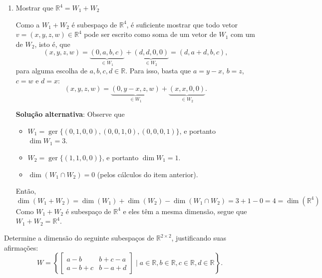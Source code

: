 \documentclass[12pt,a4paper]{article}
\newcommand*\R{\mathbb{R}}
\begin{document}
\begin{ExerciseList}
\begin{enumerate}
\item Mostrar que $\R^4 = W_1 + W_2$

Como a $W_1 + W_2$ é subespaço de $\R^4$, é suficiente mostrar que todo vetor $v = (x,y,z,w) \in \R^4$ pode ser escrito como soma de um vetor de $W_1$ com um de $W_2$, isto é, que
\[
(x,y,z,w) = \underbrace{(0,a,b,c)}_{\in W_1} + \underbrace{(d,d,0,0)}_{\in W_2} = (d,a+d,b,c),
\]
para alguma escolha de $a,b,c,d \in \R$. Para isso, basta que $a = y-x$, $b = z$, $c=w$ e $d=x$:
\[
(x,y,z,w) = \underbrace{(0,y-x,z,w)}_{\in W_1} + \underbrace{(x,x,0,0)}_{\in W_2}.
\]

\textbf{Solução alternativa}: Observe que
\begin{itemize}
\item $W_1 = \operatorname{ger}\{ (0,1,0,0), (0,0,1,0), (0,0,0,1) \}$, e portanto $\dim{W_1} = 3$.
\item $W_2 = \operatorname{ger}\{ (1,1,0,0) \}$, e portanto $\dim{W_1} = 1$.
\item $\dim{(W_1 \cap W_2)} = 0$ (pelos cálculos do item anterior).
\end{itemize}
Então,
\[
\dim{(W_1 + W_2)}
= \dim{(W_1)} + \dim{(W_2)} - \dim{(W_1 \cap W_2)}
= 3 + 1 - 0
= 4 = \dim{(\R^4)}
\]
Como $W_1 + W_2$ é subespaço de $\R^4$ e eles têm a mesma dimensão, segue que $W_1 + W_2 = \R^4$.
\end{enumerate}
\Exercise[title={2,0}] Determine a dimensão do seguinte subespaços de $\R^{2 \times 2}$, justificando suas afirmações:
\[
W = \left\{
\begin{bmatrix}
a-b     & b+c-a \\
a-b+c & b-a + d
\end{bmatrix}
\mid a \in \R, b \in \R, c \in \R, d \in \R
\right\}.
\]


\end{ExerciseList}
\end{document}

